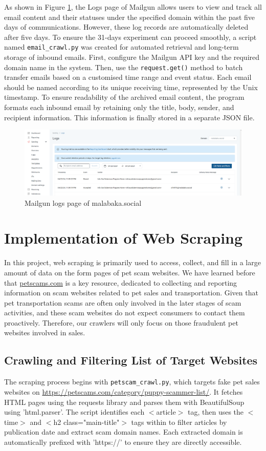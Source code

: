 \documentclass[ oneside,%
                    author={Cassie Qing Tang},
                    degree={BSc},
                     title={An Automated Response System for Disrupting Online Pet Scamming \\ },
                    subtitle={ }]{dissertation}
\begin{document}
As shown in Figure \ref{fig:pic4}, the Logs page of Mailgun allows users to view and track all email content and their statuses under the specified domain within the past five days of communications. However, these log records are automatically deleted after five days. To ensure the 31-days experiment can proceed smoothly, a script named \texttt{email\_crawl.py} was created for automated retrieval and long-term storage of inbound emails. First, configure the Mailgun API key and the required domain name in the system. Then, use the \texttt{request.get()} method to batch transfer emails based on a customised time range and event status. Each email should be named according to its unique receiving time, represented by the Unix timestamp. To ensure readability of the archived email content, the program formats each inbound email by retaining only the title, body, sender, and recipient information. This information is finally stored in a separate JSON file.
\begin{figure}[H]
\centering
\includegraphics[width=0.95\linewidth,height=0.2\textheight]{pic/figure4.png}
\caption{Mailgun logs page of malabaka.social}
\label{fig:pic4}
\end{figure}


\section{Implementation of Web Scraping}
In this project, web scraping is primarily used to access, collect, and fill in a large amount of data on the form pages of pet scam websites. We have learned before that \href{www.petscams.com}{petscams.com} is a key resource, dedicated to collecting and reporting information on scam websites related to pet sales and transportation. Given that pet transportation scams are often only involved in the later stages of scam activities, and these scam websites do not expect consumers to contact them proactively. Therefore, our crawlers will only focus on those fraudulent pet websites involved in sales.

\subsection{Crawling and Filtering List of Target Websites}
The scraping process begins with \texttt{petscam\_crawl.py}, which targets fake pet sales websites on \url{https://petscams.com/category/puppy-scammer-list/}. It fetches HTML pages using the requests library and parses them with BeautifulSoup using 'html.parser'. The script identifies each $<$article$>$ tag, then uses the $<$time$>$ and $<$h2 class="main-title"$>$ tags within to filter articles by publication date and extract scam domain names.  Each extracted domain is automatically prefixed with 'https://' to ensure they are directly accessible.
\\
\end{document}
